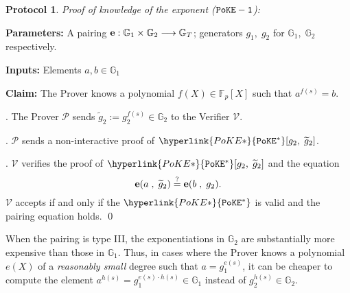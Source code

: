 \documentclass[11pt, lettersize, notitlepage, leqno, footskip=0.6cm]{article}
\newcommand{\bFp}{\mathbb{F}_p}
\newcommand{\bG}{\mathbb{G}}
\newcommand{\lra}{\longrightarrow}
\newcommand{\wti}{\widetilde}
\newcommand{\mc}{\mathcal}
\newcommand{\mb}{\mathbb}
\newcommand{\mbf}{\mathbf}
\newcommand{\mP}{\mc{P}}
\newcommand{\V}{\mc{V}}
\newcommand{\vs}{\vspace{-0.15cm}}
\newcommand{\noin}{\noindent}
\newcommand{\sta}{\stackrel{?}{=}}
\newcommand{\e}{\mbf{e}}
\newtheorem{Prot}[Thm]{Protocol}
\numberwithin{equation}{section}
\begin{document}
\begin{mdframed}

\begin{Prot} \normalfont \hypertarget{PoKE}{\textit{Proof of knowledge of the exponent }} (${\tt{PoKE-1}}$):\end{Prot} 

\noin \textbf{Parameters:} A pairing ${\bf{e}}:\mb{G}_1\times \mb{G}_2\lra \mb{G}_T$; generators $g_1,\;g_2$ for $\mb{G}_1,\; \mb{G}_2$ respectively.

\noin \textbf{Inputs:} Elements $a, b\in \mb{G}_1$

\noin \textbf{Claim:} The Prover knows a polynomial $f(X)\in \bFp[X]$ such that $a^{f(s)} = b$.\vspace{1mm}

\noin {}. The Prover $\mP$ sends $\wti{g}_2:= g_2^{f(s)}\in \bG_2$ to the Verifier $\V$.

\noin 2. $\mP$ sends a non-interactive proof of $\hyperlink{PoKE*}{{\tt{PoKE}^*}}[g_2,\;\wti{g}_2]$.

\noin 3. $\V$ verifies the proof of $\hyperlink{PoKE*}{{\tt{PoKE}^*}}[g_2,\;\wti{g}_2]$ and the equation \vs $$\e(a\;,\;\wti{g}_2) \sta \e(b\;,\;g_2). \vs $$ $\V$ accepts if and only if the $\hyperlink{PoKE*}{{\tt{PoKE}^*}}$ is valid and the pairing equation holds. \qed 
\end{mdframed}

\bigskip

When the pairing is type III, the exponentiations in $\mb{G}_2$ are substantially more expensive than those in $\mb{G}_1$. Thus, in cases where the Prover knows a polynomial $e(X)$ of a \textit{reasonably small} degree such that $a = g_1^{e(s)}$, it can be cheaper to compute the element $a^{h(s)} = g_1^{e(s)\cdot h(s)}\in \mb{G}_1$ instead of $g_2^{h(s)}\in \mb{G}_2$.




\vspace{2mm}
\end{document}
